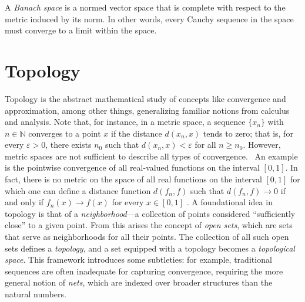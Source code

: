 \begin{definition}
  A \emph{Banach space} is a normed vector space that is complete with respect to the metric induced by its norm. In other words, every Cauchy sequence in the space must converge to a limit within the space.
\end{definition}


\section{Topology}



Topology is the abstract mathematical study of concepts like convergence and approximation, among other things, generalizing familiar notions from calculus and analysis. 
Note that, for instance, in a metric space, a sequence $\{x_n\}$ with $n \in \mathbb{N}$ converges to a point $x$ if the distance $d(x_n, x)$ tends to zero; that is, for every $\varepsilon > 0$, there exists $n_0$ such that $d(x_n, x) < \varepsilon$ for all $n \geq n_0$. However, metric spaces are not sufficient to describe all types of convergence.  An example is the pointwise convergence of all real-valued functions on the interval $[0, 1]$. In fact, there is no metric on the space of all real functions on the interval $[0,1]$ for which one can define a distance function $d(f_n, f)$ such that $d(f_n, f) \to 0$ if and only if $f_n(x) \to f(x)$ for every $x \in [0, 1]$ \cite{guide2006infinite}. 
A foundational idea in topology is that of a \emph{neighborhood}—a collection of points considered ``sufficiently close'' to a given point. From this arises the concept of \emph{open sets}, which are sets that serve as neighborhoods for all their points. The collection of all such open sets defines a \emph{topology}, and a set equipped with a topology becomes a \emph{topological space}. This framework introduces some subtleties: for example, traditional sequences are often inadequate for capturing convergence, requiring the more general notion of \emph{nets}, which are indexed over broader structures than the natural numbers.

